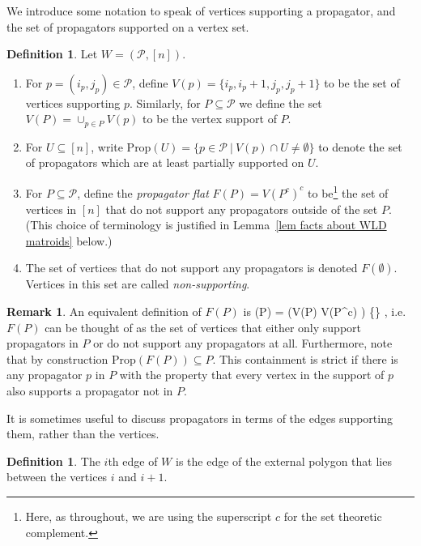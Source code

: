 \documentclass[11pt]{article}
\def\bas #1\eas{\begin{align*} #1 \end{align*}}
\newcommand{\cP}{\mathcal{P}}
\newcommand{\Prop}{\textrm{Prop}}
\theoremstyle{remark}
\theoremstyle{definition}
\newtheorem{dfn}[thm]{Definition}
\newtheorem{rmk}[thm]{Remark}
\begin{document}
\medskip

We introduce some notation to speak of vertices supporting a propagator, and the set of propagators supported on a vertex set.


\begin{dfn} \label{VPropdfn}
Let $W = (\cP, [n])$.
\begin{enumerate}
\item For $p = (i_p,j_p) \in \cP$, define $V(p) = \{i_p, i_p+1, j_p, j_p+1\}$ to be the set of vertices supporting $p$. Similarly, for $P \subseteq \cP$ we define the set $V(P) = \cup_{p \in P} V(p)$ to be the vertex support of $P$.
\item For $U \subseteq [n]$, write $\Prop(U) = \{ p \in \cP  \ | \ V(p) \cap U \neq \emptyset \} $ to denote the set of propagators which are at least partially supported on $U$.
\item For $P \subseteq \cP$, define the {\em propagator flat} $F(P) = V(P^c)^c$ to be\footnote{Here, as throughout, we are using the superscript $c$ for the set theoretic complement.} the set of vertices in $[n]$ that do not support any propagators outside of the set $P$. (This choice of terminology is justified in Lemma~\ref{lem facts about WLD matroids} below.)
\item The set of vertices that do not support any propagators is denoted $F(\emptyset)$. Vertices in this set are called {\em non-supporting}.  
\end{enumerate}
\end{dfn}



\begin{rmk}\label{alt F(P) rmk}
An equivalent definition of $F(P)$ is \bas F(P)  = \big(V(P) \setminus V(P^c) \big) \cup \{\} \;,\eas 
i.e. $F(P)$ can be thought of as the set of vertices that either only support propagators in $P$ or do not support any propagators at all. Furthermore, note that by construction $\Prop(F(P)) \subseteq P$.  This containment is strict if there is any propagator $p$ in $P$ with the property that every vertex in the support of $p$ also supports a propagator not in $P$.
\end{rmk}

It is sometimes useful to discuss propagators in terms of the edges supporting them, rather than the vertices.

\begin{dfn}\label{def:edges}
The $i$th edge of $W$ is the edge of the external polygon that lies between the vertices $i$ and $i+1$.
\end{dfn}
\end{document}
